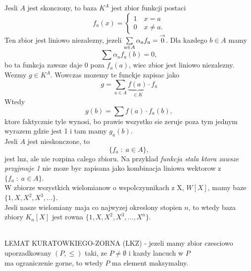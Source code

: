\documentclass{article}
\begin{document}
    Jesli $A$ jest skonczony, to baza $K^A$ jest zbior funkcji postaci 
        $$f_a(x)=\begin{cases}1\quad x=a\\0\quad x\neq a.\end{cases}$$
    Ten zbior jest liniowo niezalezny, jezeli $\sum\limits_{a\in A}\alpha_af_a=\overset{\to}{0}$. Dla kazdego $b\in A$ mamy
        $$\sum\alpha_af_a(b)=0,$$
    bo ta funkcja zawsze daje 0 poza $f_a(a)$, wiec zbior jest liniowo niezalezny.\smallskip\\
    Wezmy $g\in K^A$. Wowczas mozemy te funckje zapisac jako 
        $$g=\sum\limits_{a\in A} \underbrace{f(a)}_{\in K}\cdot f_a$$
    Wtedy 
        $$g(b)= \sum f(a)\cdot f_a(b),$$ 
    ktore faktycznie tyle wynosi, bo prawie wszystko sie zeruje poza tym jednym wyrazem gdzie jest 1 i tam mamy $g_a(b)$.\medskip\\

    Jesli \color{acc}$A$ jest nieskonczone\color{txt}, to 
        $$\{f_a\;:\;a\in A\},$$
    jest lnz, ale nie rozpina calego zbioru. Na przyklad \emph{funkcja stala ktora zawsze przyjmuje 1} nie moze byc zapisana jako kombinacja liniowa wektorow z $\{f_a\;:\;a\in A\}$.\medskip\\

    W zbiorze wszystkich wielomianow o wspolczynnikach z X, $W[X]$, mamy baze $\{1, X, X^2, X^3, ...\}$. \medskip\\
    Jesli nasze wielomiany maja co najwyzej okreslony stopien $n$, to wtedy baza zbiory $K_n[X]$ jest rowna $\{1, X, X^2, X^3, ..., X^n\}$.
    \bigskip\\\bigskip\\

    \begin{center}
        \large\color{def}LEMAT KURATOWKIEGO-ZORNA \color{txt}(LKZ) - jezeli mamy zbior czesciowo \\
        uporzadkowany $(P, \leq)$ taki, ze $P\neq \emptyset$ i kazdy lancuch w $P$ \\
        ma ograniczenie gorne, to wtedy $P$ ma element maksymalny.
    \end{center}\bigskip
\end{document}
